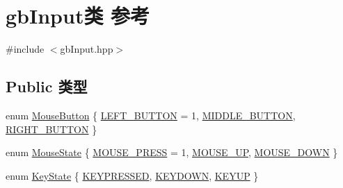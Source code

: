 \hypertarget{classgb_input}{}\section{gb\+Input类 参考}
\label{classgb_input}


{\ttfamily \#include $<$gb\+Input.\+hpp$>$}

\subsection*{Public 类型}
\begin{DoxyCompactItemize}
\item 
enum \mbox{\hyperlink{classgb_input_a8b92d031046a9cc8e432684fae3ee398}{Mouse\+Button}} \{ \mbox{\hyperlink{classgb_input_a8b92d031046a9cc8e432684fae3ee398a80e28ef31f89dc1eba1924d3f4158d2c}{L\+E\+F\+T\+\_\+\+B\+U\+T\+T\+ON}} = 1, 
\mbox{\hyperlink{classgb_input_a8b92d031046a9cc8e432684fae3ee398adcda1da9a9cc8ac3baeff0f7d72c58f7}{M\+I\+D\+D\+L\+E\+\_\+\+B\+U\+T\+T\+ON}}, 
\mbox{\hyperlink{classgb_input_a8b92d031046a9cc8e432684fae3ee398a455ee1f8d040cfacd401ee3f92a7777d}{R\+I\+G\+H\+T\+\_\+\+B\+U\+T\+T\+ON}}
 \}
\item 
enum \mbox{\hyperlink{classgb_input_adf80e0206ecdf62ba8c55e9d5ac9c290}{Mouse\+State}} \{ \mbox{\hyperlink{classgb_input_adf80e0206ecdf62ba8c55e9d5ac9c290a92dbec9042b0c9f6dc143ddc3ccb8a1b}{M\+O\+U\+S\+E\+\_\+\+P\+R\+E\+SS}} = 1, 
\mbox{\hyperlink{classgb_input_adf80e0206ecdf62ba8c55e9d5ac9c290a74c27828bd71b10d5c7f7f5551e84f77}{M\+O\+U\+S\+E\+\_\+\+UP}}, 
\mbox{\hyperlink{classgb_input_adf80e0206ecdf62ba8c55e9d5ac9c290aefb8c3996e83a308b346a37fa1b6522b}{M\+O\+U\+S\+E\+\_\+\+D\+O\+WN}}
 \}
\item 
enum \mbox{\hyperlink{classgb_input_af8c222f97119246c7b6e3c127a47a5bb}{Key\+State}} \{ \mbox{\hyperlink{classgb_input_af8c222f97119246c7b6e3c127a47a5bba043c253c8755a2382c05a951b6e92642}{K\+E\+Y\+P\+R\+E\+S\+S\+ED}}, 
\mbox{\hyperlink{classgb_input_af8c222f97119246c7b6e3c127a47a5bbabd704db303ecbb54877d6bb2f9cc0e79}{K\+E\+Y\+D\+O\+WN}}, 
\mbox{\hyperlink{classgb_input_af8c222f97119246c7b6e3c127a47a5bbad03505224e6a3670780b7e11f7a96b41}{K\+E\+Y\+UP}}
 \}
\end{DoxyCompactItemize}
